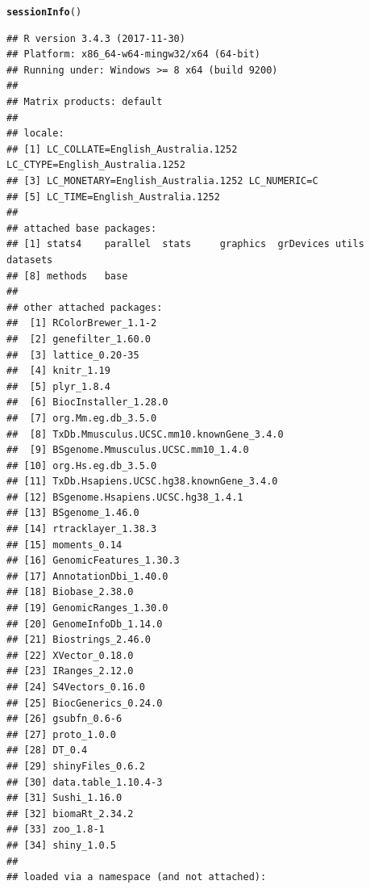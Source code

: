 \documentclass[12pt]{article}\usepackage[]{graphicx}\usepackage[]{color}
\makeatletter
\newcommand{\hlstd}[1]{\textcolor[rgb]{0.345,0.345,0.345}{#1}}%
\newcommand{\hlkwd}[1]{\textcolor[rgb]{0.737,0.353,0.396}{\textbf{#1}}}%
\newenvironment{kframe}{%
 \def\at@end@of@kframe{}%
 \ifinner\ifhmode%
  \def\at@end@of@kframe{\end{minipage}}%
  \begin{minipage}{\columnwidth}%
 \fi\fi%
 \def\FrameCommand##1{\hskip\@totalleftmargin \hskip-\fboxsep
 \colorbox{shadecolor}{##1}\hskip-\fboxsep
     \hskip-\linewidth \hskip-\@totalleftmargin \hskip\columnwidth}%
 \MakeFramed {\advance\hsize-\width
   \@totalleftmargin\z@ \linewidth\hsize
   \@setminipage}}%
 {\par\unskip\endMakeFramed%
 \at@end@of@kframe}
\newenvironment{knitrout}{}{} %
\makeatother
\begin{document}
\begin{knitrout}
\color{fgcolor}\begin{kframe}
\begin{alltt}
\hlkwd{sessionInfo}\hlstd{()}
\end{alltt}
\begin{verbatim}
## R version 3.4.3 (2017-11-30)
## Platform: x86_64-w64-mingw32/x64 (64-bit)
## Running under: Windows >= 8 x64 (build 9200)
## 
## Matrix products: default
## 
## locale:
## [1] LC_COLLATE=English_Australia.1252  LC_CTYPE=English_Australia.1252   
## [3] LC_MONETARY=English_Australia.1252 LC_NUMERIC=C                      
## [5] LC_TIME=English_Australia.1252    
## 
## attached base packages:
## [1] stats4    parallel  stats     graphics  grDevices utils     datasets 
## [8] methods   base     
## 
## other attached packages:
##  [1] RColorBrewer_1.1-2                      
##  [2] genefilter_1.60.0                       
##  [3] lattice_0.20-35                         
##  [4] knitr_1.19                              
##  [5] plyr_1.8.4                              
##  [6] BiocInstaller_1.28.0                    
##  [7] org.Mm.eg.db_3.5.0                      
##  [8] TxDb.Mmusculus.UCSC.mm10.knownGene_3.4.0
##  [9] BSgenome.Mmusculus.UCSC.mm10_1.4.0      
## [10] org.Hs.eg.db_3.5.0                      
## [11] TxDb.Hsapiens.UCSC.hg38.knownGene_3.4.0 
## [12] BSgenome.Hsapiens.UCSC.hg38_1.4.1       
## [13] BSgenome_1.46.0                         
## [14] rtracklayer_1.38.3                      
## [15] moments_0.14                            
## [16] GenomicFeatures_1.30.3                  
## [17] AnnotationDbi_1.40.0                    
## [18] Biobase_2.38.0                          
## [19] GenomicRanges_1.30.0                    
## [20] GenomeInfoDb_1.14.0                     
## [21] Biostrings_2.46.0                       
## [22] XVector_0.18.0                          
## [23] IRanges_2.12.0                          
## [24] S4Vectors_0.16.0                        
## [25] BiocGenerics_0.24.0                     
## [26] gsubfn_0.6-6                            
## [27] proto_1.0.0                             
## [28] DT_0.4                                  
## [29] shinyFiles_0.6.2                        
## [30] data.table_1.10.4-3                     
## [31] Sushi_1.16.0                            
## [32] biomaRt_2.34.2                          
## [33] zoo_1.8-1                               
## [34] shiny_1.0.5                             
## 
## loaded via a namespace (and not attached):

\end{verbatim}
\end{kframe}
\end{knitrout}
\end{document}

